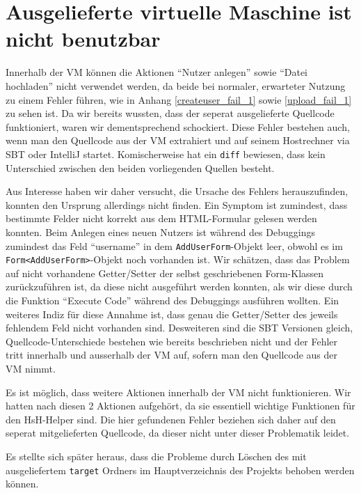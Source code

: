 \documentclass[12pt,DIV14,BCOR10mm,a4paper,parskip=half-,headsepline,headinclude,english,ngerman,bibliography=totocnumbered]{scrreprt}
\begin{document}
\vspace*{-3cm}

\tableofcontents  %

\chapter{Ausgelieferte virtuelle Maschine ist nicht benutzbar}

Innerhalb der VM können die Aktionen \enquote{Nutzer anlegen} sowie \enquote{Datei hochladen} nicht verwendet werden, da beide bei normaler, erwarteter Nutzung zu einem Fehler führen, wie in Anhang \ref{createuser_fail_1} sowie \ref{upload_fail_1} zu sehen ist.
Da wir bereits wussten, dass der seperat ausgelieferte Quellcode funktioniert, waren wir dementsprechend schockiert. 
Diese Fehler bestehen auch, wenn man den Quellcode aus der VM extrahiert und auf seinem Hostrechner via SBT oder IntelliJ startet.
Komischerweise hat ein \texttt{diff} bewiesen, dass kein Unterschied zwischen den beiden vorliegenden Quellen besteht.

Aus Interesse haben wir daher versucht, die Ursache des Fehlers herauszufinden, konnten den Ursprung allerdings nicht finden.
Ein Symptom ist zumindest, dass bestimmte Felder nicht korrekt aus dem HTML-Formular gelesen werden konnten.
Beim Anlegen eines neuen Nutzers ist während des Debuggings zumindest das Feld \enquote{username} in dem \texttt{AddUserForm}-Objekt leer, obwohl es im \texttt{Form<AddUserForm>}-Objekt noch vorhanden ist.
Wir schätzen, dass das Problem auf nicht vorhandene Getter/Setter der selbst geschriebenen Form-Klassen zurückzuführen ist, da diese nicht ausgeführt werden konnten, als wir diese durch die Funktion \enquote{Execute Code} während des Debuggings ausführen wollten.
Ein weiteres Indiz für diese Annahme ist, dass genau die Getter/Setter des jeweils fehlendem Feld nicht vorhanden sind.
Desweiteren sind die SBT Versionen gleich, Quellcode-Unterschiede bestehen wie bereits beschrieben nicht und der Fehler tritt innerhalb und ausserhalb der VM auf, sofern man den Quellcode aus der VM nimmt.

Es ist möglich, dass weitere Aktionen innerhalb der VM nicht funktionieren. Wir hatten nach diesen 2 Aktionen aufgehört, da sie essentiell wichtige Funktionen für den HsH-Helper sind.
Die hier gefundenen Fehler beziehen sich daher auf den seperat mitgelieferten Quellcode, da dieser nicht unter dieser Problematik leidet.

Es stellte sich später heraus, dass die Probleme durch Löschen des mit ausgeliefertem \texttt{target} Ordners im Hauptverzeichnis des Projekts behoben werden können.
\end{document}
